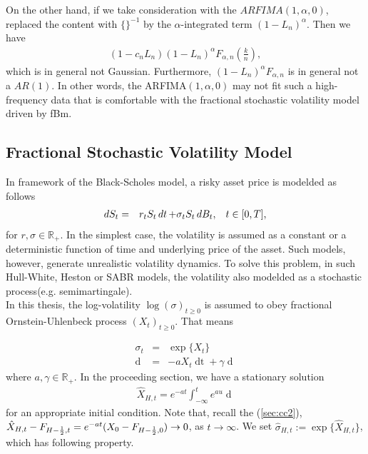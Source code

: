\documentclass[a4paper, twoside, 11pt]{article}
\theoremstyle{definition}
\begin{document}
On the other hand, if we take consideration with the $ARFIMA(1, \alpha, 0)$, replaced the content with $\{\}^{-1}$ by the $\alpha$-integrated term $(1-L_n)^\alpha$. Then we have
\begin{eqnarray*}
  (1-c_nL_n) (1-L_n)^\alpha F_{\alpha,n}(\frac{k}{n}),
\end{eqnarray*}
which is in general not Gaussian. Furthermore, $(1-L_n)^\alpha F_{\alpha,n}$ is in general not a $AR(1)$.  In other words, the ARFIMA$(1, \alpha, 0)$ may not fit such a high-frequency data that is comfortable with the fractional stochastic volatility model driven by fBm. 

\subsection{Fractional Stochastic Volatility Model}
In framework of the Black-Scholes model, a risky asset price is modelded as follows
\begin{eqnarray}
  \mathop{dS_t} &=& r_tS_t\mathop{dt} + \sigma_t S_t \mathop{dB_t},\hspace{3mm} t\in [0, T],
\end{eqnarray}
for $r, \sigma \in \mathbb{R}_{+}$. In the simplest case, the volatility is assumed as a constant or a deterministic function of time and underlying price of the asset. Such models, however, generate unrealistic volatility dynamics. To solve this problem, in 
such  Hull-White, Heston or SABR models, the volatility also modelded as a stochastic process(e.g. semimartingale).\\
In this thesis,  the log-volatility $\log(\sigma)_{t \ge 0}$ is assumed to obey fractional Ornstein-Uhlenbeck process $(X_t)_{t\ge0}$. That means

\begin{eqnarray}
  \sigma_t &=& \exp\{X_t\} \nonumber\\
  \mathop{dX_t} &=&  -a X_t \mathop{dt} + \gamma \mathop{dU_H(t)}
  \label{sec:fv}
\end{eqnarray}
where $a, \gamma \in \mathbb{R}_{+}$. In the proceeding section, we have a stationary solution 
\begin{eqnarray}
\hat{X}_{H,t}= e^{-at}\int_{-\infty}^t e^{au}\mathop{dU_H(u)}
\label{sec:fv2}
\end{eqnarray}
for an appropriate initial condition. Note that, recall the (\ref{sec:cc2}), $\hat{X}_{H,t} -  F_{H-\frac{1}{2},t} = \\e^{-at}(X_0 - F_{H-\frac{1}{2},0})\rightarrow 0 $, as $t\rightarrow \infty$. We set $\hat{\sigma}_{H,t} := \exp\{\hat{X}_{H,t}\}$, which has following property. %
\end{document}
